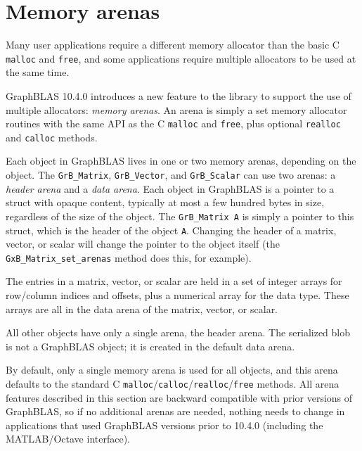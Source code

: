 \newpage
\section{Memory arenas} %
\label{sec:arenas}

Many user applications require a different memory allocator than the basic C
\verb'malloc' and \verb'free', and some applications require multiple allocators
to be used at the same time.

GraphBLAS 10.4.0 introduces a new feature to the library to support the use of
multiple allocators: {\em memory arenas}.  An arena is simply a set memory
allocator routines with the same API as the C \verb'malloc' and \verb'free', plus
optional \verb'realloc' and \verb'calloc' methods.

Each object in GraphBLAS lives in one or two memory arenas, depending on the
object.  The \verb'GrB_Matrix', \verb'GrB_Vector', and \verb'GrB_Scalar' can
use two arenas: a {\em header arena} and a {\em data arena}.  Each object in
GraphBLAS is a pointer to a struct with opaque content, typically at most a few
hundred bytes in size, regardless of the size of the object.  The
\verb'GrB_Matrix A' is simply a pointer to this struct, which is the header of
the object \verb'A'.  Changing the header of a matrix, vector, or scalar will
change the pointer to the object itself (the \verb'GxB_Matrix_set_arenas'
method does this, for example).

The entries in a matrix, vector, or scalar are held in a set of integer arrays
for row/column indices and offsets, plus a numerical array for the data type.
These arrays are all in the data arena of the matrix, vector, or scalar.

All other objects have only a single arena, the header arena.  The serialized
blob is not a GraphBLAS object; it is created in the default data arena.

By default, only a single memory arena is used for all objects, and this arena
defaults to the standard C
\verb'malloc'/\verb'calloc'/\verb'realloc'/\verb'free' methods.  All arena
features described in this section are backward compatible with prior versions
of GraphBLAS, so if no additional arenas are needed, nothing needs to change in
applications that used GraphBLAS versions prior to 10.4.0 (including the
MATLAB/Octave interface).

